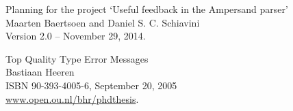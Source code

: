 \label{sec:bibliography}

\begin{thebibliography}{99}

	Planning for the project `Useful feedback in the Ampersand parser'\\
	Maarten Baertsoen and Daniel S. C. Schiavini\\
	Version 2.0 -- November 29, 2014.

	Top Quality Type Error Messages\\
	Bastiaan Heeren\\
	ISBN 90-393-4005-6, September 20, 2005\\
	\url{www.open.ou.nl/bhr/phdthesis}.

\end{thebibliography}